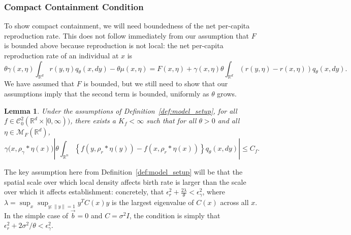 \documentclass[12pt]{article}
\newtheorem{lemma}[theorem]{Lemma}
\newcommand{\IR}{\mathbb R}
\newcommand{\meanq}{\vec b}    %
\newcommand{\covq}{C}     %
\newcommand{\kernel}{\rho}  %
\newcommand{\smooth}[1]{\kernel_{#1} \! * \!}  %
\newcommand{\measures}{\mathcal{M}_F(\IR^d)} %
\begin{document}
\subsubsection{Compact Containment Condition}

To show compact containment, we will need boundedness
of the net per-capita reproduction rate.
This does not follow immediately from our assumption that $F$ is bounded above
because reproduction is not local:
the net per-capita reproduction rate of an individual at $x$ is
$$
\theta \gamma(x, \eta) \int_{\IR^d} r(y, \eta) q_\theta(x, dy) - \theta \mu(x, \eta)
=
F(x, \eta) + \gamma(x, \eta) \theta \int_{\IR^d} (r(y, \eta) - r(x, \eta)) q_\theta(x, dy) .
$$
We have assumed that $F$ is bounded,
but we still need to show that our assumptions imply that
the second term is bounded, uniformly as $\theta$ grows.

\begin{lemma}
    \label{lem:gamma_bound}
    Under the assumptions of Definition~\ref{def:model_setup},
    for all $f \in \mathcal{C}^{2}_{0}(\IR^d \times [0,\infty))$,
    there exists a $K_f < \infty$ such that
    for all $\theta > 0$ and all $\eta \in \measures$,
    \begin{equation} \label{eqn:gamma_bound}
    \gamma\big(x,\smooth{\gamma} \eta(x)\big)
    \left| \theta 
        \int_{\IR^n} 
            \left\{
                f(y, \smooth{r} \eta(y)) - f(x, \smooth{r} \eta(x))
            \right\}
        q_{\theta}(x,dy)
    \right|
    \leq C_f     .
    \end{equation}
\end{lemma}

The key assumption here from Definition~\ref{def:model_setup}
will be that the spatial scale over which local density affects birth rate
is larger than the scale over which it affects establishment:
concretely, that $\epsilon_{r}^2 + \frac{2\lambda}{\theta} < \epsilon_{\gamma}^2$,
where $\lambda = \sup_x \sup_{y : \|y\| = 1} y^T \covq(x) y$
is the largest eigenvalue of $\covq(x)$ across all $x$.
In the simple case of $\meanq = 0$ and $\covq = \sigma^2 I$,
the condition is simply that $\epsilon_r^2 + 2\sigma^2 / \theta < \epsilon_\gamma^2$.
\end{document}
